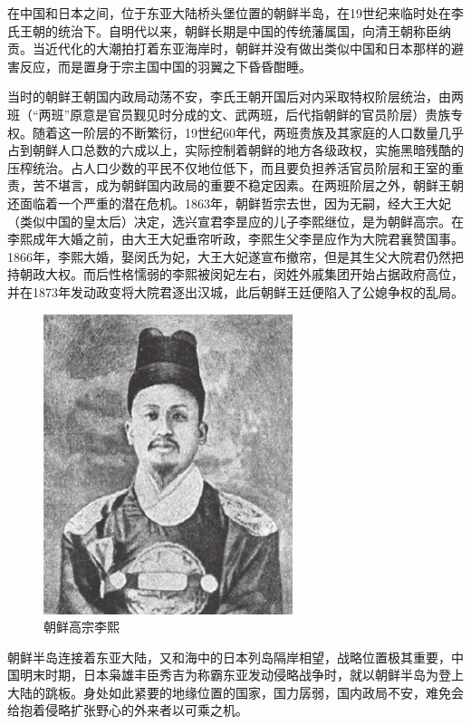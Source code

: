 \documentclass[12pt,UTF8]{ctexbook}
\begin{document}
在中国和日本之间，位于东亚大陆桥头堡位置的朝鲜半岛，在19世纪来临时处在李氏王朝的统治下。自明代以来，朝鲜长期是中国的传统藩属国，向清王朝称臣纳贡。当近代化的大潮拍打着东亚海岸时，朝鲜并没有做出类似中国和日本那样的避害反应，而是置身于宗主国中国的羽翼之下昏昏酣睡。

当时的朝鲜王朝国内政局动荡不安，李氏王朝开国后对内采取特权阶层统治，由两班（“两班”原意是官员觐见时分成的文、武两班，后代指朝鲜的官员阶层）贵族专权。随着这一阶层的不断繁衍，19世纪60年代，两班贵族及其家庭的人口数量几乎占到朝鲜人口总数的六成以上，实际控制着朝鲜的地方各级政权，实施黑暗残酷的压榨统治。占人口少数的平民不仅地位低下，而且要负担养活官员阶层和王室的重责，苦不堪言，成为朝鲜国内政局的重要不稳定因素。在两班阶层之外，朝鲜王朝还面临着一个严重的潜在危机。1863年，朝鲜哲宗去世，因为无嗣，经大王大妃（类似中国的皇太后）决定，选兴宣君李昰应的儿子李熙继位，是为朝鲜高宗。在李熙成年大婚之前，由大王大妃垂帘听政，李熙生父李昰应作为大院君襄赞国事。1866年，李熙大婚，娶闵氏为妃，大王大妃遂宣布撤帘，但是其生父大院君仍然把持朝政大权。而后性格懦弱的李熙被闵妃左右，闵姓外戚集团开始占据政府高位，并在1873年发动政变将大院君逐出汉城，此后朝鲜王廷便陷入了公媳争权的乱局。

\begin{figure}[htbp]
	\centering
	\includegraphics[width=0.7\linewidth]{3}
	\caption{朝鲜高宗李熙}
	\label{fig:1}
\end{figure}

朝鲜半岛连接着东亚大陆，又和海中的日本列岛隔岸相望，战略位置极其重要，中国明末时期，日本枭雄丰臣秀吉为称霸东亚发动侵略战争时，就以朝鲜半岛为登上大陆的跳板。身处如此紧要的地缘位置的国家，国力孱弱，国内政局不安，难免会给抱着侵略扩张野心的外来者以可乘之机。
\end{document}

